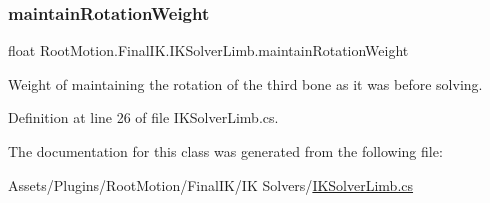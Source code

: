 \subsubsection{\texorpdfstring{maintain\+Rotation\+Weight}{maintainRotationWeight}}
{\footnotesize\ttfamily float Root\+Motion.\+Final\+I\+K.\+I\+K\+Solver\+Limb.\+maintain\+Rotation\+Weight}



Weight of maintaining the rotation of the third bone as it was before solving. 



Definition at line 26 of file I\+K\+Solver\+Limb.\+cs.



The documentation for this class was generated from the following file\+:\begin{DoxyCompactItemize}
\item 
Assets/\+Plugins/\+Root\+Motion/\+Final\+I\+K/\+I\+K Solvers/\mbox{\hyperlink{_i_k_solver_limb_8cs}{I\+K\+Solver\+Limb.\+cs}}\end{DoxyCompactItemize}

